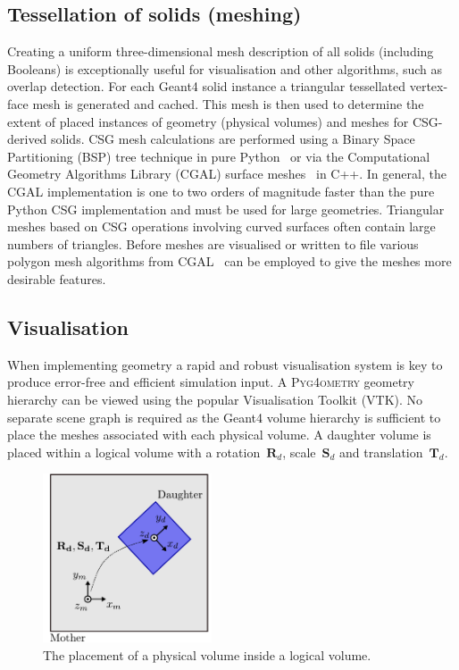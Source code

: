 \documentclass[final,5p,times,twocolumn]{elsarticle}
\newcommand{\PYGEOMETRY}{\textsc{Pyg4ometry}}
\begin{document}
\subsection{Tessellation of solids (meshing)}
Creating a uniform three-dimensional mesh description of all solids (including Booleans) is exceptionally useful for visualisation and other algorithms, such as overlap
detection. For each Geant4 solid instance a triangular tessellated vertex-face mesh is generated and cached. This mesh is then used to determine the extent
of placed instances of geometry (physical volumes) and meshes for CSG-derived solids. CSG mesh calculations are performed using a Binary Space Partitioning
(BSP) tree technique in pure Python~\cite{pycsg} or via the Computational Geometry Algorithms Library (CGAL) surface meshes~\cite{cgal:bsmf-sm-20b} in C++. In
general, the CGAL implementation is one to two orders of magnitude faster than the pure Python CSG implementation and must be used for large geometries.
Triangular meshes based on CSG operations involving curved surfaces often contain large numbers of triangles. Before meshes are visualised or written to file
various polygon mesh algorithms  from CGAL~\cite{cgal:lty-pmp-20b} can be employed to give the meshes more desirable features.


\subsection{Visualisation} \label{sec:visualisation}
When implementing geometry a rapid and robust visualisation system is key to produce error-free and efficient simulation input.
A  \PYGEOMETRY{} geometry hierarchy can be viewed using the popular Visualisation Toolkit (VTK). No separate scene graph is required as the Geant4
volume hierarchy is sufficient to place the meshes associated with each physical volume. A daughter volume is placed within a logical volume with a
rotation~$\mathbf{R}_d$, scale~$\mathbf{S}_d$ and translation~$\mathbf{T}_d$.

\begin{figure}[htb!]
\begin{center}
\includegraphics[width=5cm]{./diagrams/lvToPv.pdf}
\caption{The placement of a physical volume inside a logical volume.}
\label{fig:lvToPv}
\end{center}
\end{figure}
\end{document}
